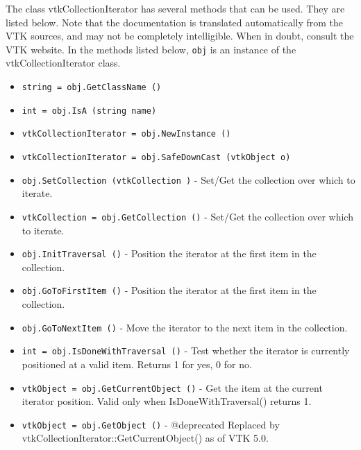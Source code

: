 The class vtkCollectionIterator has several methods that can be used.
  They are listed below.
Note that the documentation is translated automatically from the VTK sources,
and may not be completely intelligible.  When in doubt, consult the VTK website.
In the methods listed below, \verb|obj| is an instance of the vtkCollectionIterator class.
\begin{itemize}
\item  \verb|string = obj.GetClassName ()|

\item  \verb|int = obj.IsA (string name)|

\item  \verb|vtkCollectionIterator = obj.NewInstance ()|

\item  \verb|vtkCollectionIterator = obj.SafeDownCast (vtkObject o)|

\item  \verb|obj.SetCollection (vtkCollection )| -  Set/Get the collection over which to iterate.

\item  \verb|vtkCollection = obj.GetCollection ()| -  Set/Get the collection over which to iterate.

\item  \verb|obj.InitTraversal ()| -  Position the iterator at the first item in the collection.

\item  \verb|obj.GoToFirstItem ()| -  Position the iterator at the first item in the collection.

\item  \verb|obj.GoToNextItem ()| -  Move the iterator to the next item in the collection.

\item  \verb|int = obj.IsDoneWithTraversal ()| -  Test whether the iterator is currently positioned at a valid item.
 Returns 1 for yes, 0 for no.

\item  \verb|vtkObject = obj.GetCurrentObject ()| -  Get the item at the current iterator position.  Valid only when
 IsDoneWithTraversal() returns 1.

\item  \verb|vtkObject = obj.GetObject ()| -  @deprecated Replaced by vtkCollectionIterator::GetCurrentObject() as
 of VTK 5.0.

\end{itemize}
